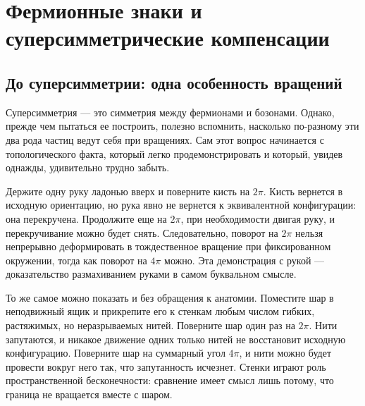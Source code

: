 \chapter{Фермионные знаки и суперсимметрические компенсации}


\section{До суперсимметрии: одна особенность вращений}

Суперсимметрия — это симметрия между фермионами и бозонами. Однако, прежде чем пытаться ее построить, полезно вспомнить, насколько по-разному эти два рода частиц ведут себя при вращениях. Сам этот вопрос начинается с топологического факта, который легко продемонстрировать и который, увидев однажды, удивительно трудно забыть.

Держите одну руку ладонью вверх и поверните кисть на \(2\pi\). Кисть вернется в исходную ориентацию, но рука явно не вернется к эквивалентной конфигурации: она перекручена. Продолжите еще на \(2\pi\), при необходимости двигая руку, и перекручивание можно будет снять. Следовательно, поворот на \(2\pi\) нельзя непрерывно деформировать в тождественное вращение при фиксированном окружении, тогда как поворот на \(4\pi\) можно. Эта демонстрация с рукой — доказательство размахиванием руками в самом буквальном смысле.

То же самое можно показать и без обращения к анатомии. Поместите шар в неподвижный ящик и прикрепите его к стенкам любым числом гибких, растяжимых, но неразрываемых нитей. Поверните шар один раз на \(2\pi\). Нити запутаются, и никакое движение одних только нитей не восстановит исходную конфигурацию. Поверните шар на суммарный угол \(4\pi\), и нити можно будет провести вокруг него так, что запутанность исчезнет. Стенки играют роль пространственной бесконечности: сравнение имеет смысл лишь потому, что граница не вращается вместе с шаром.

